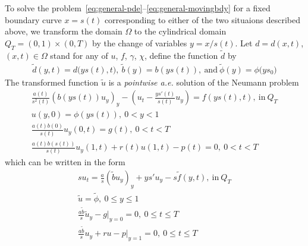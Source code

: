 \documentclass[letterpaper, 10pt, draft]{amsart}
\theoremstyle{definition}
\theoremstyle{remark}
\begin{document}
To solve the problem~\eqref{eq:general-pde}--\eqref{eq:general-movingbdy} for a
fixed boundary curve $x=s(t)$ corresponding to either of the two situaions
described above, we transform the domain $\Omega$ to the cylindrical domain
$Q_T = (0,1)\times (0,T)$ by the change of variables $y=x/s(t)$.
Let $d = d(x, t)$, $(x, t) \in \Omega$ stand for any of $u$, $f$, $\gamma$, $\chi$, define the function $\tilde{d}$ by
\begin{gather*}
  \tilde{d}(y,t) = d\big(y s(t), t\big),~
  \tilde{b}(y) = b(y s(t)),~\text{and}~
  \tilde{\phi}(y) = \phi\big(y s_0\big)
\end{gather*}
\def\utilde{\tilde{u}}
The transformed function $\utilde$ is a \emph{pointwise a.e.} solution of the
Neumann problem
\begin{gather}
  \frac{a(t)}{s^2(t)} {(b(ys(t)) u_y)}_y
  - \left(u_t - \frac{y s'(t)}{s(t)} u_y\right)= f(ys(t),t),~\text{in}~Q_T\nonumber
  \\
  u(y,0) = \phi(ys(t)),~0<y<1\nonumber
  \\
  \frac{a(t)b(0)}{s(t)} u_y(0,t) = g(t),~0<t<T\nonumber
  \\
  \frac{a(t)b(s(t))}{s(t)} u_y(1,t) + r(t) u(1,t) - p(t)=0,~0<t<T\nonumber
\end{gather}
which can be written in the form
\begin{gather}
  s u_t = \frac{a}{s} {(\tilde{b} u_y)}_y
  + y s' u_y
  - s \tilde{f}(y,t),~\text{in}~Q_T\label{eq:tform-pde}
  \\
  \utilde = \tilde{\phi}, ~0 \leq y \leq 1 \label{eq:tform-iv}
  \\
  \frac{a \tilde{b}}{s} \utilde_y - g \vert_{y=0}= 0, ~0 \leq t \leq T   \label{eq:tform-lbdy}
  \\
  \frac{a\tilde{b}}{s} u_y + r u - p \vert_{y=1} = 0, ~0 \leq t \leq T \label{eq:tform-rbdy}
\end{gather}
\end{document}
